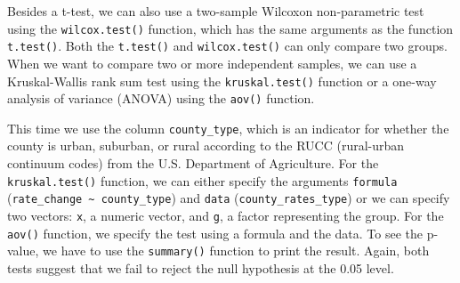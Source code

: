 \documentclass[
  letterpaper,
]{krantz}
\makeatletter
\newenvironment{Shaded}{\begin{snugshade}}{\end{snugshade}}
\newcommand{\AttributeTok}[1]{\textcolor[rgb]{0.40,0.45,0.13}{#1}}
\newcommand{\CommentTok}[1]{\textcolor[rgb]{0.37,0.37,0.37}{#1}}
\newcommand{\ConstantTok}[1]{\textcolor[rgb]{0.56,0.35,0.01}{#1}}
\newcommand{\FunctionTok}[1]{\textcolor[rgb]{0.28,0.35,0.67}{#1}}
\newcommand{\NormalTok}[1]{\textcolor[rgb]{0.00,0.23,0.31}{#1}}
\newcommand{\OtherTok}[1]{\textcolor[rgb]{0.00,0.23,0.31}{#1}}
\newcommand{\SpecialCharTok}[1]{\textcolor[rgb]{0.37,0.37,0.37}{#1}}
\newcommand{\StringTok}[1]{\textcolor[rgb]{0.13,0.47,0.30}{#1}}
\newenvironment{kframe}{%
\medskip{}
\setlength{\fboxsep}{.8em}
 \def\at@end@of@kframe{}%
 \ifinner\ifhmode%
  \def\at@end@of@kframe{\end{minipage}}%
  \begin{minipage}{\columnwidth}%
 \fi\fi%
 \def\FrameCommand##1{\hskip\@totalleftmargin \hskip-\fboxsep
 \colorbox{shadecolor}{##1}\hskip-\fboxsep
     \hskip-\linewidth \hskip-\@totalleftmargin \hskip\columnwidth}%
 \MakeFramed {\advance\hsize-\width
   \@totalleftmargin\z@ \linewidth\hsize
   \@setminipage}}%
 {\par\unskip\endMakeFramed%
 \at@end@of@kframe}
\renewenvironment{Shaded}{\begin{kframe}}{\end{kframe}}
\makeatother
\begin{document}
\begin{Shaded}
\end{Shaded}

Besides a t-test, we can also use a two-sample Wilcoxon non-parametric
test using the \texttt{wilcox.test()} function, which has the same
arguments as the function \texttt{t.test()}. Both the \texttt{t.test()}
and \texttt{wilcox.test()} can only compare two groups. When we want to
compare two or more independent samples, we can use a Kruskal-Wallis
rank sum test using the \texttt{kruskal.test()} function or a one-way
analysis of variance (ANOVA) using the \texttt{aov()} function.

This time we use the column \texttt{county\_type}, which is an indicator
for whether the county is urban, suburban, or rural according to the
RUCC (rural-urban continuum codes) from the U.S. Department of
Agriculture. For the \texttt{kruskal.test()} function, we can either
specify the arguments \texttt{formula}
(\texttt{rate\_change\ \textasciitilde{}\ county\_type}) and
\texttt{data} (\texttt{county\_rates\_type}) or we can specify two
vectors: \texttt{x}, a numeric vector, and \texttt{g}, a factor
representing the group. For the \texttt{aov()} function, we specify the
test using a formula and the data. To see the p-value, we have to use
the \texttt{summary()} function to print the result. Again, both tests
suggest that we fail to reject the null hypothesis at the 0.05 level.
\end{document}
